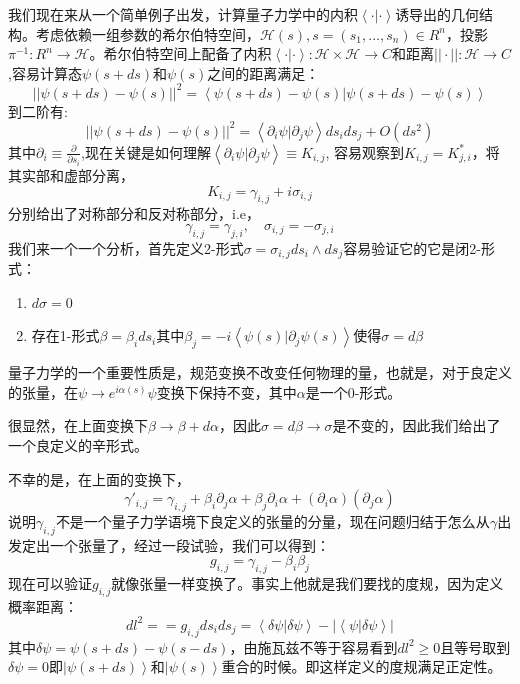 \documentclass[supercite]{HustGraduPaper}
\newcommand{\ket}[1]{\left| #1 \right\rangle}
\newcommand{\bracket}[2]{\left\langle #1|#2 \right\rangle}
\begin{document}
	
	
	我们现在来从一个简单例子出发，计算量子力学中的内积$\bracket{\cdot}{\cdot}$诱导出的几何结构。考虑依赖一组参数的希尔伯特空间，$\mathcal{H}(s), s = (s_1,\ldots,s_n) \in R^n$，投影$\pi^{-1}: R^n \to \mathcal{H}$。希尔伯特空间上配备了内积$\bracket{\cdot}{\cdot}: \mathcal{H} \times \mathcal{H} \to C$和距离$||\cdot||: \mathcal{H} \to C$,容易计算态$\psi(s + ds)$和$\psi(s)$之间的距离满足：
	\begin{equation}
	||\psi(s+ds) - \psi(s)||^2 = \bracket{\psi(s+ds)-\psi(s)}{\psi(s+ds)-\psi(s)}
	\end{equation}
	到二阶有:
	\begin{equation}
		||\psi(s+ds) - \psi(s)||^2 = \bracket{\partial_i \psi}{\partial_j \psi} ds_i ds_j + O(ds^2)
	\end{equation}
	其中$\partial_i \equiv \frac{\partial}{\partial s_i}$,现在关键是如何理解$ \bracket{\partial_i \psi}{\partial_j \psi} \equiv K_{i,j}$, 容易观察到$K_{i,j} = K^*_{j,i}$，将其实部和虚部分离，
	\begin{equation}
	K_{i,j} = \gamma_{i,j} + i \sigma_{i,j}
	\end{equation}
	分别给出了对称部分和反对称部分，i.e，
	\begin{equation}
	\gamma_{i,j} = \gamma_{j,i}, \quad \sigma_{i,j} = -\sigma_{j,i}
	\end{equation}
	我们来一个一个分析，首先定义2-形式$\sigma = \sigma_{i,j} ds_i\wedge ds_j$容易验证它的它是闭2-形式：
	\begin{enumerate}
		\item $d\sigma = 0$
		\item 存在1-形式$\beta = \beta_i ds_i$其中$\beta_j = -i \bracket{\psi(s)}{\partial_j \psi(s)}$使得$\sigma = d\beta $
	\end{enumerate}

量子力学的一个重要性质是，规范变换不改变任何物理的量，也就是，对于良定义的张量，在$\psi \to e^{i\alpha(s)}\psi$变换下保持不变，其中$\alpha$是一个0-形式。

很显然，在上面变换下$\beta \to \beta + d\alpha$，因此$\sigma = d\beta \to \sigma$是不变的，因此我们给出了一个良定义的辛形式。

不幸的是，在上面的变换下，
\begin{equation}
\gamma'_{i,j} = \gamma_{i,j} + \beta_i \partial_j \alpha + \beta_j \partial_i \alpha + (\partial_i \alpha)(\partial_j \alpha) 
\end{equation}
说明$\gamma_{i,j}$不是一个量子力学语境下良定义的张量的分量，现在问题归结于怎么从$\gamma$出发定出一个张量了，经过一段试验，我们可以得到：
\begin{equation}
g_{i,j} = \gamma_{i,j} - \beta_i \beta_j
\end{equation}
现在可以验证$g_{i,j}$就像张量一样变换了。事实上他就是我们要找的度规，因为定义概率距离：
\begin{equation}
dl^2=  = g_{i,j} ds_i ds_j = \bracket{\delta \psi}{\delta \psi} - |\bracket{\psi}{\delta \psi}|
\end{equation}
其中$\delta \psi = \psi(s+ds) - \psi(s-ds)$，由施瓦兹不等于容易看到$dl^2 \ge 0$且等号取到$\delta \psi =0$即$\ket{\psi(s + ds)}$和$\ket{\psi(s)}$重合的时候。即这样定义的度规满足正定性。
\end{document}
